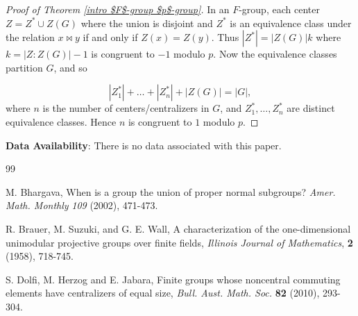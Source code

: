\documentclass[12pt]{amsart}
\newtheorem{theorem}{Theorem}[section]
\begin{document}
{%

\begin{proof}[Proof of Theorem \ref{intro $F$-group $p$-group}]
In an $F$-group, each center $Z = Z^* \cup Z(G)$ where the union is disjoint and $Z^*$ is an equivalence class under the relation $x \bowtie y$ if and only if $Z(x) = Z(y)$.  Thus $|Z^*| = |Z(G)|k$ where $k=|Z : Z(G)| -1$ is congruent to $-1$ modulo $p$.   Now the equivalence classes partition $G$, and so

$$|Z_1^*| + \dots + |Z_n^*| + |Z(G)| = |G|,$$ 
where $n$ is the number of centers/centralizers in $G$, and $Z_1^*, \dots, Z_n^*$ are distinct equivalence classes. Hence $n$ is congruent to $1$ modulo $p$. 
\end{proof}

\bigskip

{\bf Data Availability}:  There is no data associated with this paper.

\begin{thebibliography}{99}

 M. Bhargava, When is a group the union of proper normal subgroups? {\it Amer. Math. Monthly} {\it 109} (2002), 471-473.

 R. Brauer, M. Suzuki, and G. E. Wall,  A characterization of the one-dimensional unimodular projective groups over finite fields, {\it Illinois Journal of Mathematics}, {\bf 2} (1958), 718-745.
	
 S. Dolfi, M. Herzog and E. Jabara, Finite groups whose noncentral commuting elements have centralizers of equal size, {\it Bull. Aust. Math. Soc.} {\bf 82} (2010), 293-304.
	
	


\end{thebibliography}}
\end{document}
